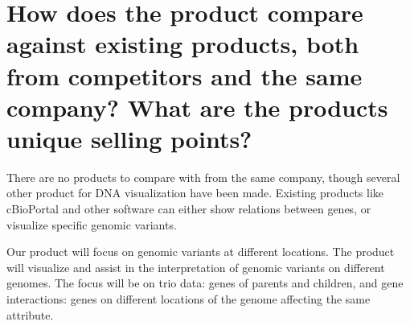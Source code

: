 \section{How does the product compare against existing products, both from competitors and the same company? What are the products unique selling points?}
There are no products to compare with from the same company, though several other product for DNA visualization have been made.
Existing products like cBioPortal \cite{cbio} and other software can either show relations between genes, or visualize specific genomic variants. %

Our product will focus on genomic variants at different locations.
The product will visualize and assist in the interpretation of genomic variants on different genomes.
The focus will be on trio data: genes of parents and children, and gene interactions: genes on different locations of the genome affecting the same attribute.
